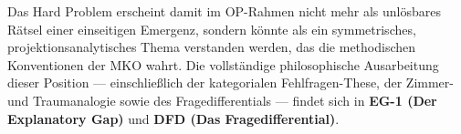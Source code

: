 \documentclass[11pt,a4paper]{article}
\theoremstyle{definition}
\theoremstyle{plain}
\begin{document}
Das Hard Problem erscheint damit im OP-Rahmen nicht mehr als unlösbares R\"{a}tsel einer
einseitigen Emergenz, sondern k\"{o}nnte als ein symmetrisches, projektionsanalytisches
Thema verstanden werden, das die methodischen Konventionen der MKO wahrt. Die
vollst\"{a}ndige philosophische Ausarbeitung dieser Position --- einschlie\ss{}lich der
kategorialen Fehlfragen-These, der Zimmer- und Traumanalogie sowie des
Fragedifferentials --- findet sich in \textbf{EG-1 (Der Explanatory Gap)} und
\textbf{DFD (Das Fragedifferential)}.
\end{document}
